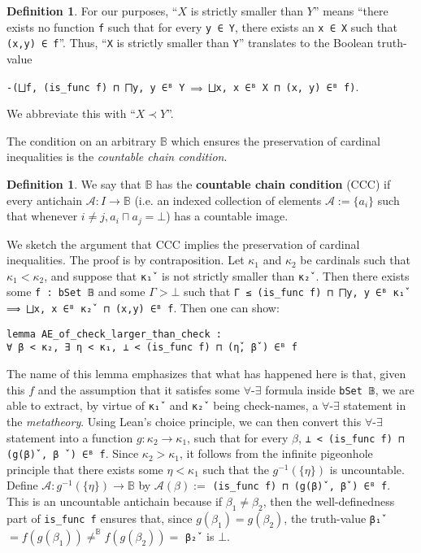 \documentclass[a4paper,USenglish,cleveref, autoref]{lipics-v2019}
\newcommand{\B}{\mathbb{B}}
\newcommand{\lil}{\lstinline}
\theoremstyle{theorem}
\theoremstyle{definition}
\newtheorem{defn}[definition]{Definition}
\begin{document}
\begin{defn}
  For our purposes, ``$X$ is strictly smaller than $Y$'' means ``there exists no function \lil{f} such that for every \lil{y ∈ Y}, there exists an \lil{x ∈ X} such that \lil{(x,y) ∈ f}''. Thus, ``\lil{X} is strictly smaller than \lil{Y}'' translates to the Boolean truth-value
\begin{center}\lstinline{-(⨆f, (is_func f) ⊓ ⨅y, y ∈ᴮ Y ⟹ ⨆x, x ∈ᴮ X ⊓ (x, y) ∈ᴮ f)}.\end{center} We abbreviate this with ``$X \prec Y$''.
\end{defn}

The condition on an arbitrary $\B$ which ensures the preservation of cardinal inequalities is the \emph{countable chain condition}.

\begin{defn}
We say that $\B$ has the \textbf{countable chain condition} (CCC) if every antichain $\mathcal{A} : I \to \B$ (i.e. an indexed collection of elements $\mathcal{A} := \{a_i\}$ such that whenever $i \neq j, a_i \sqcap a_j = \bot$) has a countable image.
\end{defn}

We sketch the argument that CCC implies the preservation of cardinal inequalities. The proof is by contraposition. Let $\kappa_1$ and $\kappa_2$ be cardinals such that $\kappa_1 < \kappa_2$, and suppose that \lil{κ₁̌ } is not strictly smaller than \lil{κ₂̌ }. Then there exists some \lil{f : bSet 𝔹} and some $\Gamma > \bot$ such that \lstinline{Γ ≤ (is_func f) ⊓ ⨅y, y ∈ᴮ κ₁̌  ⟹ ⨆x, x ∈ᴮ κ₂̌  ⊓ (x,y) ∈ᴮ f}. Then one can show:
\begin{lstlisting}
lemma AE_of_check_larger_than_check :
∀ β < κ₂, ∃ η < κ₁, ⊥ < (is_func f) ⊓ (η̌, β̌ ) ∈ᴮ f
\end{lstlisting}
The name of this lemma emphasizes that what has happened here is that, given this $f$ and the assumption that it satisfes some $\forall$-$\exists$ formula inside \lil{bSet 𝔹}, we are able to extract, by virtue of \lil{κ₁̌ } and \lil{κ₂̌ } being check-names, a $\forall$-$\exists$ statement in the \emph{metatheory}. Using Lean's choice principle, we can then convert this $\forall$-$\exists$ statement into a function $g : \kappa_2 \to \kappa_1$, such that for every $\beta$, \lstinline{⊥ < (is_func f) ⊓ (g(β)̌ , β ̌ ) ∈ᴮ f}. Since $\kappa_2 > \kappa_1$, it follows from the infinite pigeonhole principle that there exists some $\eta < \kappa_1$ such that the $g^{-1}(\{\eta\})$ is uncountable. Define $\mathcal{A} : g^{-1}(\{\eta\}) \to \B$ by $\mathcal{A}(\beta) :=$ \lil{(is_func f) ⊓ (g(β)̌ , β̌ ) ∈ᴮ f}. This is an uncountable antichain because if $\beta_1 \neq \beta_2$, then the well-definedness part of \lil{is_func f} ensures that, since $g(\beta_1) = g(\beta_2)$, the truth-value \lil{β₁̌ } $= f(g(\beta_1)) \neq^\B f(g(\beta_2)) =$ \lil{β₂̌ } is $\bot$.
\end{document}
